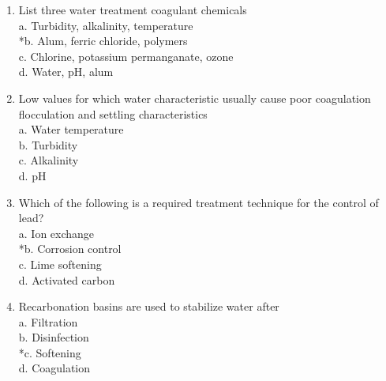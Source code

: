 \begin{enumerate}
\item List three water treatment coagulant chemicals\\
a.	Turbidity, alkalinity, temperature\\
*b.	Alum, ferric chloride, polymers\\
c.	Chlorine, potassium permanganate, ozone\\
d.	Water, pH, alum\\

\item Low values for which water characteristic usually cause poor coagulation flocculation and settling characteristics\\
a.	Water temperature\\
b.	Turbidity\\
c.	Alkalinity\\
d.	pH\\

\item Which of the following is a required treatment technique for the control of lead?\\
a.	Ion exchange\\
*b.	Corrosion control\\
c.	Lime softening\\
d.	Activated carbon\\

\item Recarbonation basins are used to stabilize water after\\
a.	Filtration\\
b.	Disinfection\\
*c.  Softening\\
d.	Coagulation\\
\end{enumerate}

